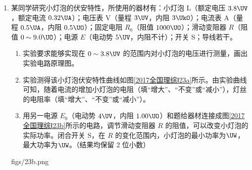 \documentclass[\gkver]{gaokaozhenti}
\begin{document}
\begin{enumerate}
{figs/22b.png}


\item
某同学研究小灯泡的伏安特性，所使用的器材有：小灯泡 L（额定电压 $3.8\UV$，额定电流 $0.32\UA$）；电压表 V（量程 $3\UV$，内阻 $3\UkO$）；电流表 A（量程 $0.5\UA$，内阻 $0.5\UO$）；固定电阻 $R_{0}$（阻值 $1000\UO$）；滑动变阻器 $R$（阻值 $0\sim9.0\UO$）；电源 $E$（电动势 $5\UV$，内阻不计）；开关 S；导线若干。

\begin{enumerate}
	\item
	实验要求能够实现在 $0\sim3.8\UV$ 的范围内对小灯泡的电压进行测量，画出实验电路原理图。

	\item
	实验测得该小灯泡伏安特性曲线如图\ref{2017全国理综Ⅰ23a}所示。由实验曲线可知，随着电流的增加小灯泡的电阻（填“增大”、“不变”或“减小”），灯丝的电阻率（填“增大”、“不变”或“减小”）。

	\item
	用另一电源 $E_{0}$（电动势 $4\UV$，内阻 $1.00\UO$）和题给器材连接成图\ref{2017全国理综Ⅰ23b}所示的电路，调节滑动变阻器 $R$ 的阻值，可以改变小灯泡的实际功率。闭合开关 S，在 $R$ 的变化范围内，小灯泡的最小功率为$\UW$，最大功率为$\UW$。（结果均保留 2 位小数）
\end{enumerate}

{figs/23b.png}


\end{enumerate}
\end{document}
